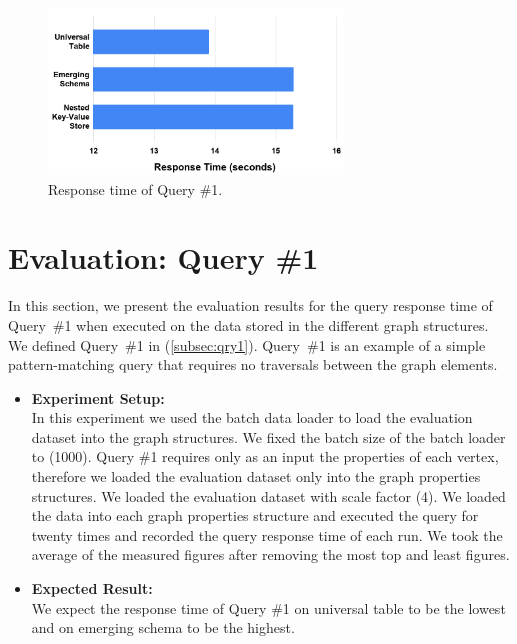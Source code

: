 {\begin{itemize}
\end{itemize}



\begin{figure}[H]
\centering
\includegraphics[width=0.7\textwidth]{pics/Query1-Eval.png}
\caption{Response time of Query \#1.}
\label{fig:eval-query1}
\end{figure} 



\section{Evaluation: Query \#1}
\label{sec:eval-qry1}

In this section, we present the evaluation results for the query response time of \mbox{Query \#1} when executed on the data stored in the different graph structures. We defined \mbox{Query \#1} in (\ref{subsec:qry1}). \mbox{Query \#1} is an example of a simple pattern-matching query that requires no traversals between the graph elements.


\begin{itemize}

\item \textbf{Experiment Setup:}\\
In this experiment we used the batch data loader to load the evaluation dataset into the graph structures. We fixed the batch size of the batch loader to (1000). Query \#1 requires only as an input the properties of each vertex, therefore we loaded the evaluation dataset only into the graph properties structures. We loaded the evaluation dataset with scale factor (4). We loaded the data into each graph properties structure and executed the query for twenty times and recorded the query response time of each run. We took the average of the measured figures after removing the most top and least figures.


\item \textbf{Expected Result:}\\
We expect the response time of Query \#1 on universal table to be the lowest and on emerging schema to be the highest.



\end{itemize}}
